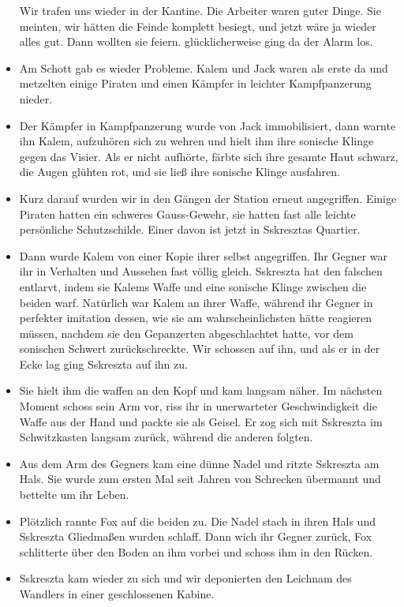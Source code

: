 \documentclass[11pt]{article}
\begin{document}
\begin{itemize}
  Wir trafen uns wieder in der Kantine. Die Arbeiter waren guter Dinge.
  Sie meinten, wir hätten die Feinde komplett besiegt, und jetzt wäre ja
  wieder alles gut. Dann wollten sie feiern. glücklicherweise ging da
  der Alarm los.
\item
  Am Schott gab es wieder Probleme. Kalem und Jack waren als erste da
  und metzelten einige Piraten und einen Kämpfer in leichter
  Kampfpanzerung nieder.
\item
  Der Kämpfer in Kampfpanzerung wurde von Jack immobilisiert, dann
  warnte ihn Kalem, aufzuhören sich zu wehren und hielt ihm ihre
  sonische Klinge gegen das Visier. Als er nicht aufhörte, färbte sich
  ihre gesamte Haut schwarz, die Augen glühten rot, und sie ließ ihre
  sonische Klinge ausfahren.
\item
  Kurz darauf wurden wir in den Gängen der Station erneut angegriffen.
  Einige Piraten hatten ein schweres Gauss-Gewehr, sie hatten fast alle
  leichte persönliche Schutzschilde. Einer davon ist jetzt in Sskresztas
  Quartier.
\item
  Dann wurde Kalem von einer Kopie ihrer selbst angegriffen. Ihr Gegner
  war ihr in Verhalten und Aussehen fast völlig gleich. Sskreszta hat
  den falschen entlarvt, indem sie Kalems Waffe und eine sonische Klinge
  zwischen die beiden warf. Natürlich war Kalem an ihrer Waffe, während
  ihr Gegner in perfekter imitation dessen, wie sie am
  wahrscheinlichsten hätte reagieren müssen, nachdem sie den Gepanzerten
  abgeschlachtet hatte, vor dem sonischen Schwert zurückschreckte. Wir
  schossen auf ihn, und als er in der Ecke lag ging Sskreszta auf ihn
  zu.
\item
  Sie hielt ihm die waffen an den Kopf und kam langsam näher. Im
  nächsten Moment schoss sein Arm vor, riss ihr in unerwarteter
  Geschwindigkeit die Waffe aus der Hand und packte sie als Geisel. Er
  zog sich mit Sskreszta im Schwitzkasten langsam zurück, während die
  anderen folgten.
\item
  Aus dem Arm des Gegners kam eine dünne Nadel und ritzte Sskreszta am
  Hals. Sie wurde zum ersten Mal seit Jahren von Schrecken übermannt und
  bettelte um ihr Leben.
\item
  Plötzlich rannte Fox auf die beiden zu. Die Nadel stach in ihren Hals
  und Sskreszta Gliedmaßen wurden schlaff. Dann wich ihr Gegner zurück,
  Fox schlitterte über den Boden an ihm vorbei und schoss ihm in den
  Rücken.
\item
  Sskreszta kam wieder zu sich und wir deponierten den Leichnam des
  Wandlers in einer geschlossenen Kabine.

\end{itemize}
\end{document}
